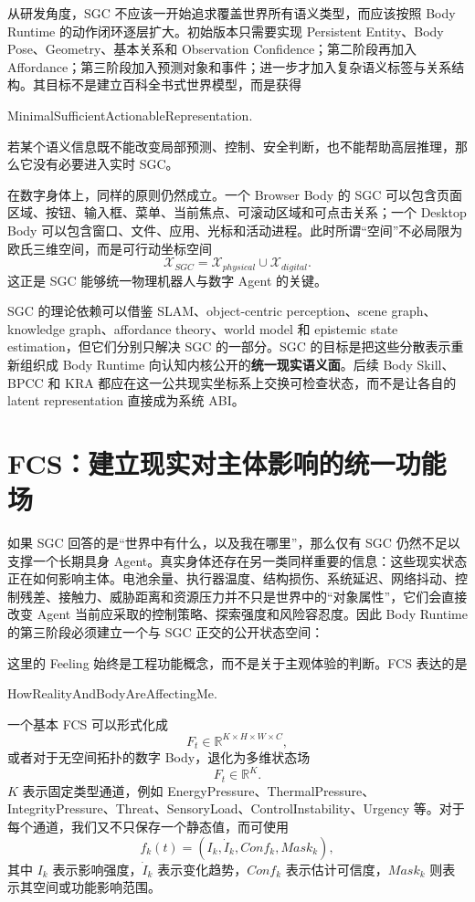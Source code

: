 从研发角度，SGC 不应该一开始追求覆盖世界所有语义类型，而应该按照 Body Runtime 的动作闭环逐层扩大。初始版本只需要实现 Persistent Entity、Body Pose、Geometry、基本关系和 Observation Confidence；第二阶段再加入 Affordance；第三阶段加入预测对象和事件；进一步才加入复杂语义标签与关系结构。其目标不是建立百科全书式世界模型，而是获得
\begin{statementbox}
MinimalSufficientActionableRepresentation.
\end{statementbox}
若某个语义信息既不能改变局部预测、控制、安全判断，也不能帮助高层推理，那么它没有必要进入实时 SGC。

在数字身体上，同样的原则仍然成立。一个 Browser Body 的 SGC 可以包含页面区域、按钮、输入框、菜单、当前焦点、可滚动区域和可点击关系；一个 Desktop Body 可以包含窗口、文件、应用、光标和活动进程。此时所谓“空间”不必局限为欧氏三维空间，而是可行动坐标空间
\[
\mathcal X_{SGC}
=
\mathcal X_{physical}
\cup
\mathcal X_{digital}.
\]
这正是 SGC 能够统一物理机器人与数字 Agent 的关键。

SGC 的理论依赖可以借鉴 SLAM、object-centric perception、scene graph、knowledge graph、affordance theory、world model 和 epistemic state estimation，但它们分别只解决 SGC 的一部分。SGC 的目标是把这些分散表示重新组织成 Body Runtime 向认知内核公开的\textbf{统一现实语义面}。后续 Body Skill、BPCC 和 KRA 都应在这一公共现实坐标系上交换可检查状态，而不是让各自的 latent representation 直接成为系统 ABI。

\section{FCS：建立现实对主体影响的统一功能场}

如果 SGC 回答的是“世界中有什么，以及我在哪里”，那么仅有 SGC 仍然不足以支撑一个长期具身 Agent。真实身体还存在另一类同样重要的信息：这些现实状态正在如何影响主体。电池余量、执行器温度、结构损伤、系统延迟、网络抖动、控制残差、接触力、威胁距离和资源压力并不只是世界中的“对象属性”，它们会直接改变 Agent 当前应采取的控制策略、探索强度和风险容忍度。因此 Body Runtime 的第三阶段必须建立一个与 SGC 正交的公开状态空间：
\begin{statementbox}
\centering
{}
\end{statementbox}

这里的 Feeling 始终是工程功能概念，而不是关于主观体验的判断。FCS 表达的是
\begin{statementbox}
HowRealityAndBodyAreAffectingMe.
\end{statementbox}
一个基本 FCS 可以形式化成
\[
F_t
\in
\mathbb R^{K\times H\times W\times C},
\]
或者对于无空间拓扑的数字 Body，退化为多维状态场
\[
F_t
\in
\mathbb R^K.
\]
$K$ 表示固定类型通道，例如 EnergyPressure、ThermalPressure、IntegrityPressure、Threat、SensoryLoad、ControlInstability、Urgency 等。对于每个通道，我们又不只保存一个静态值，而可使用
\[
f_k(t)
=
\left(
I_k,
\dot I_k,
Conf_k,
Mask_k
\right),
\]
其中 $I_k$ 表示影响强度，$\dot I_k$ 表示变化趋势，$Conf_k$ 表示估计可信度，$Mask_k$ 则表示其空间或功能影响范围。


